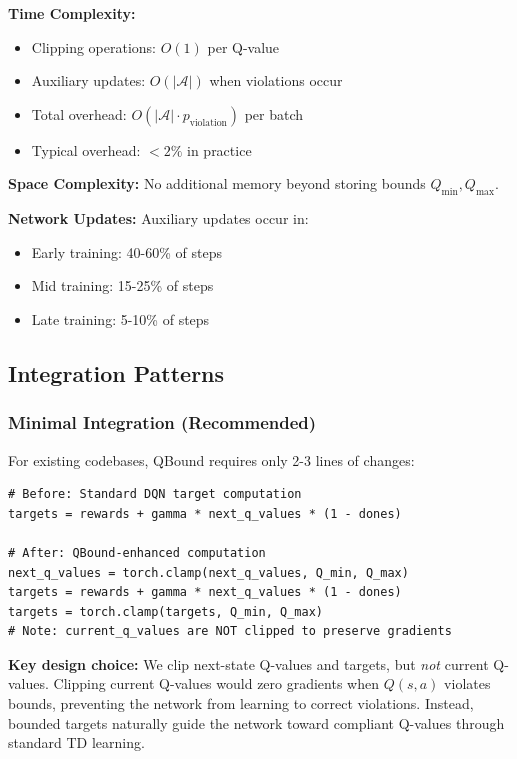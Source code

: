 \documentclass[11pt]{article}
\theoremstyle{definition}
\theoremstyle{remark}
\begin{document}
\textbf{Time Complexity:}
\begin{itemize}
    \item Clipping operations: $O(1)$ per Q-value
    \item Auxiliary updates: $O(|\mathcal{A}|)$ when violations occur
    \item Total overhead: $O(|\mathcal{A}| \cdot p_{\text{violation}})$ per batch
    \item Typical overhead: $< 2\%$ in practice
\end{itemize}

\textbf{Space Complexity:} No additional memory beyond storing bounds $Q_{\min}, Q_{\max}$.

\textbf{Network Updates:} Auxiliary updates occur in:
\begin{itemize}
    \item Early training: 40-60\% of steps
    \item Mid training: 15-25\% of steps
    \item Late training: 5-10\% of steps
\end{itemize}

\subsection{Integration Patterns}

\subsubsection{Minimal Integration (Recommended)}

For existing codebases, QBound requires only 2-3 lines of changes:

\begin{lstlisting}
# Before: Standard DQN target computation
targets = rewards + gamma * next_q_values * (1 - dones)

# After: QBound-enhanced computation
next_q_values = torch.clamp(next_q_values, Q_min, Q_max)
targets = rewards + gamma * next_q_values * (1 - dones)
targets = torch.clamp(targets, Q_min, Q_max)
# Note: current_q_values are NOT clipped to preserve gradients
\end{lstlisting}

\textbf{Key design choice:} We clip next-state Q-values and targets, but \textit{not} current Q-values. Clipping current Q-values would zero gradients when $Q(s,a)$ violates bounds, preventing the network from learning to correct violations. Instead, bounded targets naturally guide the network toward compliant Q-values through standard TD learning.
\end{document}
